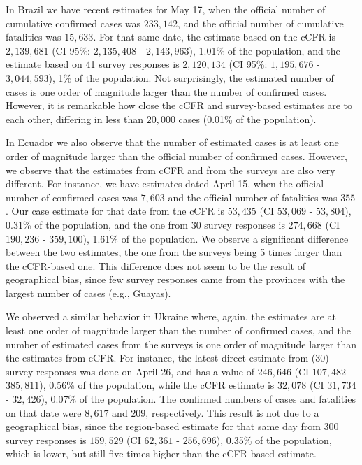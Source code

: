 \documentclass[sigconf]{acmart}
\begin{document}
In Brazil we have recent estimates for May 17, when the official number of cumulative confirmed cases 
was $233,142$, and the official number of cumulative fatalities was $15,633$. For that same date, the estimate based on the cCFR is $2,139,681$ (CI 95\%: $2,135,408$ - $2,143,963$), 1.01\% of the population, and the estimate based on 41 survey responses is $2,120,134$ (CI  95\%: $1,195,676$ - $3,044,593$), 1\% of the population. Not surprisingly, the estimated number of cases is one order of magnitude larger than the number of confirmed cases. However, it is remarkable how close the cCFR and survey-based estimates are to each other, differing in less than $20,000$ cases (0.01\% of the population).

In Ecuador we also observe that the number of estimated cases is at least one order of magnitude larger than the official number of confirmed cases. However, we observe that the estimates from cCFR and from the surveys are also very different. For instance, we have estimates dated April 15, when the official number of confirmed cases was $7,603$ and the official number of fatalities was $355$. Our case estimate for that date from the cCFR is $53,435$ (CI $53,069$ - $53,804$), 0.31\% of the population, and the one from 30 survey responses is $274,668$ (CI $190,236$ - $359,100$), 1.61\% of the population. We observe a significant difference between the two estimates, the one from the surveys being 5 times larger than the cCFR-based one. This difference does not seem to be the result of geographical bias, since few survey responses came from the provinces with the largest number of cases (e.g., Guayas).

We observed a similar behavior in Ukraine where, again, the estimates are at least one order of magnitude larger than the number of confirmed cases, and the number of estimated cases from the surveys is one order of magnitude larger than the estimates from cCFR. For instance,
the latest direct estimate from (30) survey responses was done on April 26, and has a value of $246,646$ (CI $107,482$ - $385,811$), 0.56\% of the population, while the cCFR estimate is $32,078$ (CI $31,734$ - $32,426$), 0.07\% of the population. The confirmed numbers of cases and fatalities on that date were $8,617$ and $209$, respectively. This result is not due to a geographical bias, since the region-based estimate for that same day from 300 survey responses is $159,529$ (CI $62,361$ - $256,696$), 0.35\% of the population, which is lower, but still five times higher than the cCFR-based estimate.
\end{document}
